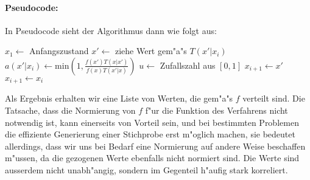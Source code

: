 	
	
	\paragraph{Pseudocode:}
	In Pseudocode sieht der Algorithmus dann wie folgt aus:
	\begin{algorithmic}
		\STATE $x_1 \leftarrow$ Anfangszustand
			\STATE $x'\leftarrow$ ziehe Wert gem"a"s $T(x'|x_i)$
			\STATE $a(x'|x_i) \leftarrow \text{min}\left(1, \frac{f(x')T(x|x')}{f(x)T(x'|x)}\right)$
			\STATE $u\leftarrow$ Zufallszahl aus $[0,1]$
				\STATE $x_{i+1} \leftarrow x'$
			\ELSE	\STATE $x_{i+1} \leftarrow x_i$
			\ENDIF
	  \ENDFOR
	\end{algorithmic}
	Als Ergebnis erhalten wir eine Liste von Werten, die gem"a"s $f$ verteilt sind.
	Die Tatsache, dass die Normierung von $f$ f"ur die Funktion des Verfahrens nicht notwendig ist, kann einerseits von Vorteil sein, und bei bestimmten Problemen die effiziente Generierung einer Stichprobe erst m"oglich machen, sie bedeutet allerdings, dass wir uns bei Bedarf eine Normierung auf andere Weise beschaffen m"ussen, da die gezogenen Werte ebenfalls nicht normiert sind. Die Werte sind ausserdem nicht unabh"angig, sondern im Gegenteil h"aufig stark korreliert.


